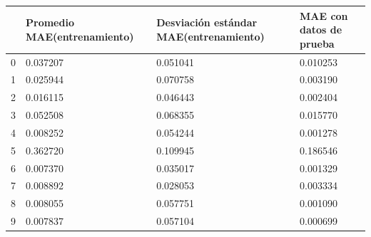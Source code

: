 \begin{tabular}{llll}
\toprule
 & Promedio MAE(entrenamiento) & Desviación estándar MAE(entrenamiento) & MAE con datos de prueba \\
\midrule
0 & 0.037207 & 0.051041 & 0.010253 \\
1 & 0.025944 & 0.070758 & 0.003190 \\
2 & 0.016115 & 0.046443 & 0.002404 \\
3 & 0.052508 & 0.068355 & 0.015770 \\
4 & 0.008252 & 0.054244 & 0.001278 \\
5 & 0.362720 & 0.109945 & 0.186546 \\
6 & 0.007370 & 0.035017 & 0.001329 \\
7 & 0.008892 & 0.028053 & 0.003334 \\
8 & 0.008055 & 0.057751 & 0.001090 \\
9 & 0.007837 & 0.057104 & 0.000699 \\
\bottomrule
\end{tabular}
